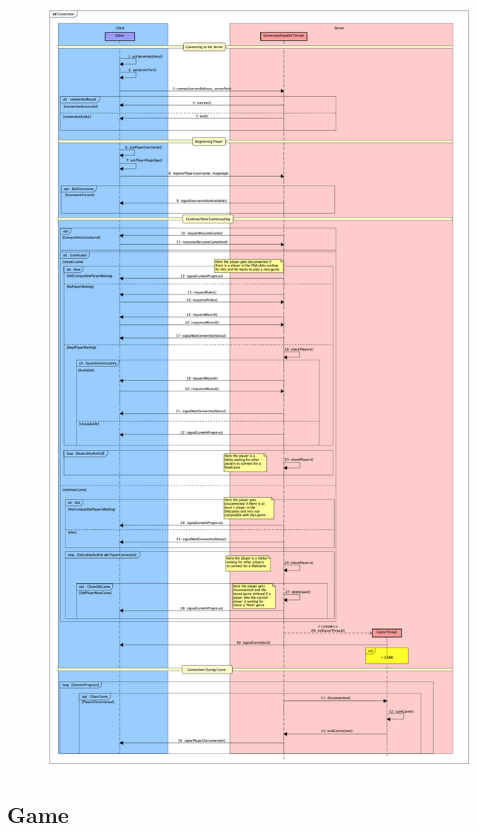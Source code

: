 \documentclass[12pt]{article}
\begin{document}
					
		\begin{figure}[htp]
			\centering
			\includegraphics[width=\textwidth,height=\textheight,keepaspectratio]{Connection}
		\end{figure}
	
		\newpage
	
		\subsection{Game}
		
\end{document}
